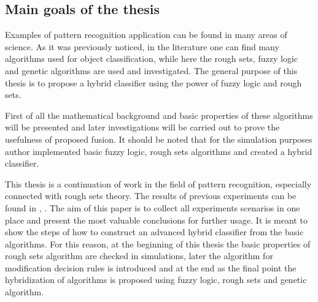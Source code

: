 \subsection{Main goals of the  thesis}
Examples of pattern recognition application can be found in many areas of
science. As it was previously noticed, in the literature one can find many algorithms 
used for object classification, while here the rough sets, fuzzy logic and genetic algorithms are used 
and investigated. The general purpose of this thesis is to propose a hybrid
classifier using the power of fuzzy logic and rough sets.

First of all the mathematical background and basic properties of these algorithms 
will be presented and later investigations will be carried out to prove 
the usefulness of proposed fusion. It should be noted that for the simulation purposes author
implemented basic fuzzy logic, rough sets algorithms and created a hybrid
classifier.

This thesis is a continuation of work in the field of pattern recognition,
especially connected with rough sets theory. The results of previous experiments can 
be found in \cite{bib34}, \cite{bib35}. 
The aim of this paper is to collect all experiments scenarios in one place and
present the most valuable conclusions for further usage. It is meant to show
the steps of how to construct an advanced hybrid
classifier from the basic algorithms. For this reason, at the beginning of this
thesis the basic properties of rough sets algorithm are checked in simulations, later the algorithm for 
modification decision rules is introduced and at the end as the final point
the hybridization of algorithms is proposed using fuzzy logic, rough sets and
genetic algorithm.

